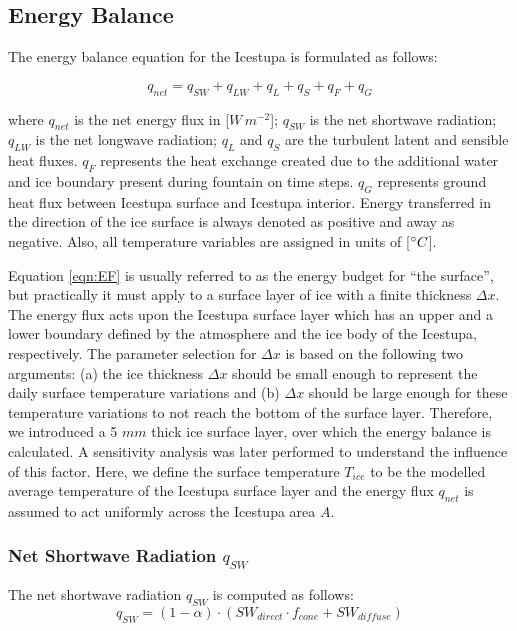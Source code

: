 \documentclass[utf8]{frontiersSCNS} %
\begin{document}
\subsection{Energy Balance} \label{section:EB}

The energy balance equation for the Icestupa is formulated as follows:

\begin{equation} q_{net} = q_{SW} + q_{LW} + q_{L} + q_{S} + q_{F} + q_{G} \label{eqn:EF} \end{equation}

where $q_{net}$ is the net energy flux in [$W\,m^{-2}$]; $q_{SW}$ is the net shortwave radiation; $q_{LW}$ is the net
longwave radiation; $q_{L}$ and $q_{S}$ are the turbulent latent and sensible heat fluxes. $q_{F}$ represents the heat
exchange created due to the additional water and ice boundary present during fountain on time steps. $q_{G}$
represents ground heat flux between Icestupa surface and Icestupa interior. Energy transferred in the direction of the
ice surface is always denoted as positive and away as negative. Also, all temperature variables are assigned in units
of [$\degree C$]. 

Equation \ref{eqn:EF} is usually referred to as the energy budget for “the surface”, but practically it must apply to
a surface layer of ice with a finite thickness $\Delta x$. The energy flux acts upon the Icestupa surface layer which
has an upper and a lower boundary defined by the atmosphere and the ice body of the Icestupa, respectively. The
parameter selection for $\Delta x$ is based on the following two arguments: (a) the ice thickness $\Delta x$ should be
small enough to represent the daily surface temperature variations and (b) $\Delta x$ should be large enough for these
temperature variations to not reach the bottom of the surface layer.  Therefore, we introduced a 5 $mm$ thick ice
surface layer, over which the energy balance is calculated. A sensitivity analysis was later performed to understand
the influence of this factor. Here, we define the surface temperature $T_{ice}$ to be the modelled average temperature
of the Icestupa surface layer and the energy flux $q_{net}$ is assumed to act uniformly across the Icestupa area $A$.

\subsubsection{Net Shortwave Radiation $q_{SW}$} The net shortwave radiation $q_{SW}$ is computed as follows:
\begin{equation} q_{SW} = (1- \alpha)\cdot (SW_{direct} \cdot f_{cone} + SW_{diffuse}) \label{eqn:SW} \end{equation}
\end{document}
